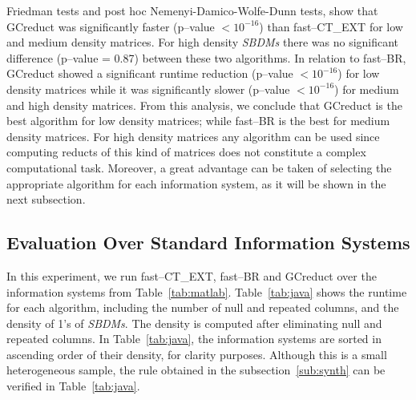 \documentclass[authoryear,preprint,review,12pt]{elsarticle}
\begin{document}
	Friedman tests and post hoc Nemenyi-Damico-Wolfe-Dunn tests, show that GCreduct was significantly faster (p--value $< 10^{-16}$) than fast--CT\_EXT for low and medium density matrices. For high density \textit{SBDMs} there was no significant difference (p--value = 0.87) between these two algorithms. In relation to fast--BR, GCreduct showed a significant runtime reduction (p--value $< 10^{-16}$) for low density matrices while it was significantly slower (p--value $< 10^{-16}$) for medium and high density matrices. 
	From this analysis, we conclude that GCreduct is the best algorithm for low density matrices; while fast--BR is the best for medium density matrices. For high density matrices any algorithm can be used since computing reducts of this kind of matrices does not constitute a complex computational task. Moreover, a great advantage can be taken of selecting the appropriate algorithm for each information system, as it will be shown in the next subsection. 
	
\subsection{Evaluation Over Standard Information Systems}\label{sub:eval}
	In this experiment, we run fast--CT\_EXT, fast--BR and GCreduct over the information systems from Table~\ref{tab:matlab}. Table~\ref{tab:java} shows the runtime for each algorithm, including the number of null and repeated columns, and the density of 1's of \textit{SBDMs}. The density is computed after eliminating null and repeated columns. In Table~\ref{tab:java}, the information systems are sorted in ascending order of their density, for clarity purposes. Although this is a small heterogeneous sample, the rule obtained in the subsection~\ref{sub:synth} can be verified in Table~\ref{tab:java}.
\end{document}
